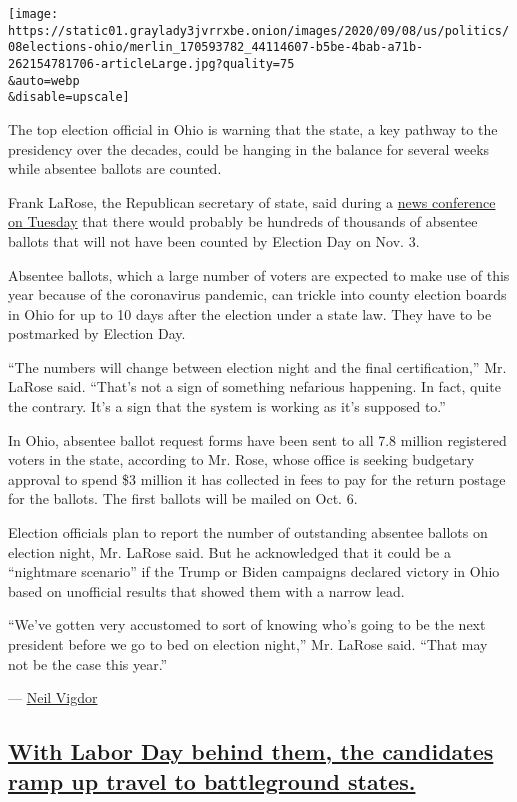 \texttt{[image: https://static01.graylady3jvrrxbe.onion/images/2020/09/08/us/politics/08elections-ohio/merlin\_170593782\_44114607-b5be-4bab-a71b-262154781706-articleLarge.jpg?quality=75\\\&auto=webp\\\&disable=upscale]}

The top election official in Ohio is warning that the state, a key
pathway to the presidency over the decades, could be hanging in the
balance for several weeks while absentee ballots are counted.

Frank LaRose, the Republican secretary of state, said during a
\href{https://www.youtube.com/watch?v=WHN2Ol58SEA}{news conference on
Tuesday} that there would probably be hundreds of thousands of absentee
ballots that will not have been counted by Election Day on Nov. 3.

Absentee ballots, which a large number of voters are expected to make
use of this year because of the coronavirus pandemic, can trickle into
county election boards in Ohio for up to 10 days after the election
under a state law. They have to be postmarked by Election Day.

``The numbers will change between election night and the final
certification,'' Mr. LaRose said. ``That's not a sign of something
nefarious happening. In fact, quite the contrary. It's a sign that the
system is working as it's supposed to.''

In Ohio, absentee ballot request forms have been sent to all 7.8 million
registered voters in the state, according to Mr. Rose, whose office is
seeking budgetary approval to spend \$3 million it has collected in fees
to pay for the return postage for the ballots. The first ballots will be
mailed on Oct. 6.

Election officials plan to report the number of outstanding absentee
ballots on election night, Mr. LaRose said. But he acknowledged that it
could be a ``nightmare scenario'' if the Trump or Biden campaigns
declared victory in Ohio based on unofficial results that showed them
with a narrow lead.

``We've gotten very accustomed to sort of knowing who's going to be the
next president before we go to bed on election night,'' Mr. LaRose said.
``That may not be the case this year.''

--- \href{https://www.nytimes3xbfgragh.onion/by/neil-vigdor}{Neil
Vigdor}

\hypertarget{with-labor-day-behind-them-the-candidates-ramp-up-travel-to-battleground-states}{%
\subsection{\texorpdfstring{\protect\hyperlink{with-labor-day-behind-them-the-candidates-ramp-up-travel-to-battleground-states}{With
Labor Day behind them, the candidates ramp up travel to battleground
states.}}{With Labor Day behind them, the candidates ramp up travel to battleground states.}}\label{with-labor-day-behind-them-the-candidates-ramp-up-travel-to-battleground-states}}

